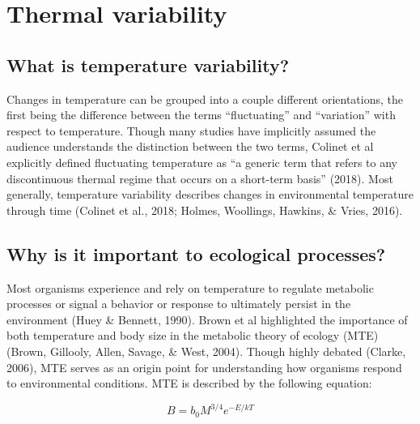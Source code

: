 \documentclass[12pt,twoside]{reedthesis}
\begin{document}
\hypertarget{thermal-variability}{%
\section{Thermal variability}\label{thermal-variability}}

\hypertarget{what-is-temperature-variability}{%
\subsection{What is temperature variability?}\label{what-is-temperature-variability}}

Changes in temperature can be grouped into a couple different orientations, the first being the difference between the terms ``fluctuating'' and ``variation'' with respect to temperature. Though many studies have implicitly assumed the audience understands the distinction between the two terms, Colinet et al explicitly defined fluctuating temperature as ``a generic term that refers to any discontinuous thermal regime that occurs on a short-term basis'' (2018). Most generally, temperature variability describes changes in environmental temperature through time (Colinet et al., 2018; Holmes, Woollings, Hawkins, \& Vries, 2016).

\hypertarget{why-is-it-important-to-ecological-processes}{%
\subsection{Why is it important to ecological processes?}\label{why-is-it-important-to-ecological-processes}}

Most organisms experience and rely on temperature to regulate metabolic processes or signal a behavior or response to ultimately persist in the environment (Huey \& Bennett, 1990). Brown et al highlighted the importance of both temperature and body size in the metabolic theory of ecology (MTE) (Brown, Gillooly, Allen, Savage, \& West, 2004). Though highly debated (Clarke, 2006), MTE serves as an origin point for understanding how organisms respond to environmental conditions. MTE is described by the following equation:

\[
B = b_0M^{3/4}e^{-E/kT}
\]
\end{document}
